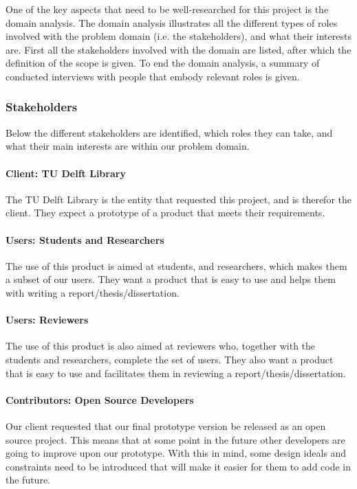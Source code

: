 One of the key aspects that need to be well-researched for this project is the domain analysis. The domain analysis illustrates all the different types of roles involved with the problem domain (i.e. the stakeholders), and what their interests are. First all the stakeholders involved with the domain are listed, after which the definition of the scope is given. To end the domain analysis, a summary of conducted interviews with people that embody relevant roles is given.

\subsubsection{Stakeholders} %

Below the different stakeholders are identified, which roles they can take, and what their main interests are within our problem domain.

\paragraph{Client: TU Delft Library} The TU Delft Library is the entity that requested this project, and is therefor the client. They expect a prototype of a product that meets their requirements.

\paragraph{Users: Students and Researchers} The use of this product is aimed at students, and researchers, which makes them a subset of our users. They want a product that is easy to use and helps them with writing a report/thesis/dissertation.

\paragraph{Users: Reviewers} The use of this product is also aimed at reviewers who, together with the students and researchers, complete the set of users. They also want a product that is easy to use and facilitates them in reviewing a report/thesis/dissertation.

\paragraph{Contributors: Open Source Developers} Our client requested that our final prototype version be released as an open source project. This means that at some point in the future other developers are going to improve upon our prototype. With this in mind, some design ideals and constraints need to be introduced that will make it easier for them to add code in the future.


